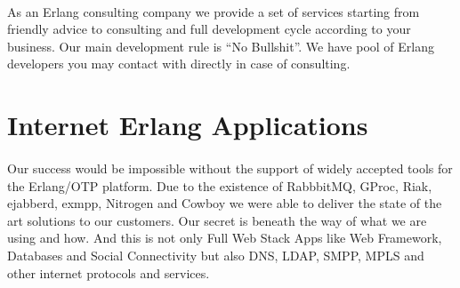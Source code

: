 \documentclass[11pt]{article}
\begin{document}
\paragraph{}
As an Erlang consulting company we provide a set of services starting from friendly advice to
consulting and full development cycle according to your business.
Our main development rule is ``No Bullshit''.
We have pool of Erlang developers you may contact with directly in case of consulting.



\section*{Internet Erlang Applications}
\paragraph{}
Our success would be impossible without the support of widely accepted tools
for the Erlang/OTP platform. Due to the existence of RabbbitMQ, GProc, Riak,
ejabberd, exmpp, Nitrogen and Cowboy we were able to deliver the state
of the art solutions to our customers. Our secret is beneath the way of
what we are using and how. And this is not only Full Web Stack Apps like Web Framework,
Databases and Social Connectivity but also DNS, LDAP, SMPP, MPLS and other internet
protocols and services.



\end{document}
